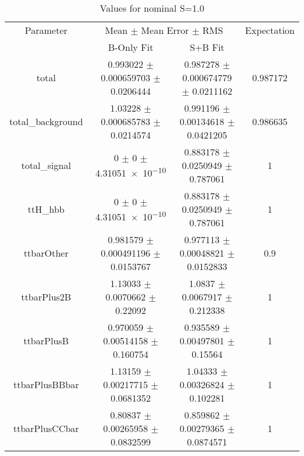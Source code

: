 \begin{table}
\centering
\caption{Values for nominal S=1.0}
\begin{tabular}{cccc}
\toprule
Parameter & \multicolumn{2}{c}{Mean $\pm$ Mean Error $\pm$ RMS} & Expectation\\
 & B-Only Fit & S+B Fit & \\
\midrule
total & \num{0.993022} $\pm$ \num{0.000659703} $\pm$ \num{0.0206444} & \num{0.987278} $\pm$ \num{0.000674779} $\pm$ \num{0.0211162} & \num{0.987172}\\
total\_background & \num{1.03228} $\pm$ \num{0.000685783} $\pm$ \num{0.0214574} & \num{0.991196} $\pm$ \num{0.00134618} $\pm$ \num{0.0421205} & \num{0.986635}\\
total\_signal & \num{0} $\pm$ \num{0} $\pm$ \num{4.31051e-10} & \num{0.883178} $\pm$ \num{0.0250949} $\pm$ \num{0.787061} & \num{1}\\
ttH\_hbb & \num{0} $\pm$ \num{0} $\pm$ \num{4.31051e-10} & \num{0.883178} $\pm$ \num{0.0250949} $\pm$ \num{0.787061} & \num{1}\\
ttbarOther & \num{0.981579} $\pm$ \num{0.000491196} $\pm$ \num{0.0153767} & \num{0.977113} $\pm$ \num{0.00048821} $\pm$ \num{0.0152833} & \num{0.9}\\
ttbarPlus2B & \num{1.13033} $\pm$ \num{0.0070662} $\pm$ \num{0.22092} & \num{1.0837} $\pm$ \num{0.0067917} $\pm$ \num{0.212338} & \num{1}\\
ttbarPlusB & \num{0.970059} $\pm$ \num{0.00514158} $\pm$ \num{0.160754} & \num{0.935589} $\pm$ \num{0.00497801} $\pm$ \num{0.15564} & \num{1}\\
ttbarPlusBBbar & \num{1.13159} $\pm$ \num{0.00217715} $\pm$ \num{0.0681352} & \num{1.04333} $\pm$ \num{0.00326824} $\pm$ \num{0.102281} & \num{1}\\
ttbarPlusCCbar & \num{0.80837} $\pm$ \num{0.00265958} $\pm$ \num{0.0832599} & \num{0.859862} $\pm$ \num{0.00279365} $\pm$ \num{0.0874571} & \num{1}\\
\bottomrule
\end{tabular}
\end{table}